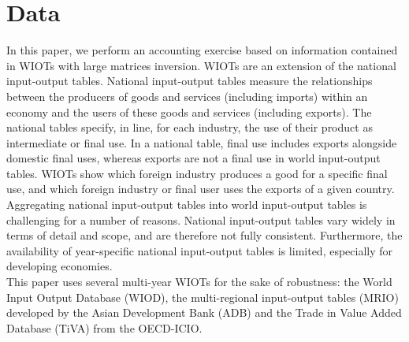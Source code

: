\documentclass[11pt,a4paper]{paper} %
\begin{document}


\section{Data}
\label{sec:data}

In this paper, we perform an accounting exercise based on information contained in WIOTs with large matrices inversion. 
WIOTs are an extension of the national input-output tables. 
National input-output tables measure the relationships between the producers of goods and services (including imports) within an economy and the users of these goods and services (including exports). The national tables specify, in line, for each industry, the use of their product as intermediate or final use. 
In a national table, final use includes exports alongside domestic final uses, whereas exports are not a final use in world input-output tables. 
WIOTs show which foreign industry produces a good for a specific final use, and which foreign industry or final user uses the exports of a given country. \\
Aggregating national input-output tables into world input-output tables is challenging for a number of reasons. National input-output tables vary widely in terms of detail and scope, and are therefore not fully consistent. Furthermore, the availability of year-specific national input-output tables is limited, especially for developing economies.  \\
This paper uses several multi-year WIOTs for the sake of robustness: the World Input Output Database (WIOD), the multi-regional input-output tables (MRIO) developed by the Asian Development Bank (ADB) and the Trade in Value Added Database (TiVA) from the OECD-ICIO.
\end{document}

